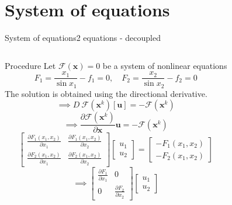 \documentclass{beamer}
\begin{document}
\section{System of equations}

\begin{frame}{System of equations}{2 equations - decoupled}
    \vspace{-2em}
    \begin{columns}[t]
        \begin{block}{\footnotesize Procedure}
            \scriptsize
            Let $\mathcal{F}(\textbf{x})=0$ be a system of nonlinear equations
            \[
                F_1 =\frac{x_1}{\sin x_1} - f_1 = 0 ,\quad F_2 =\frac{x_2}{\sin x_2} - f_2 = 0
            \]
            The solution is obtained using the directional derivative.
            \vspace{-1em}
            \[\implies D\ \mathcal{F}(\textbf{x}^k)[\textbf{u}]=-\mathcal{F}(\textbf{x}^k)\]
            \[\implies \frac{\partial\mathcal{F}(\textbf{x}^k)}{\partial \textbf{x}}\textbf{u}=-\mathcal{F}(\textbf{x}^k)\]
            \[
                \begin{bmatrix}
                    \frac{\partial F_1(x_1,x_2)}{\partial x_1} & \frac{\partial F_1(x_1,x_2)}{\partial x_2} \\
                    \frac{\partial F_2(x_1,x_2)}{\partial x_1} & \frac{\partial F_2(x_1,x_2)}{\partial x_2}
                \end{bmatrix}
                \begin{bmatrix}
                    u_1 \\ u_2
                \end{bmatrix}
                =
                \begin{bmatrix}
                    -F_1(x_1,x_2) \\
                    -F_2(x_1,x_2) 
                \end{bmatrix}
            \]
            \[
                \implies
                \begin{bmatrix}
                    \frac{\partial F_1}{\partial x_1} & 0 \\
                    0 & \frac{\partial F_2}{\partial x_2}
                \end{bmatrix}
                \begin{bmatrix}
                    u_1 \\ u_2

\end{bmatrix}\]
\end{block}
\end{columns}
\end{frame}
\end{document}
